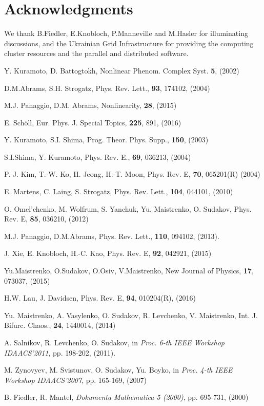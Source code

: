 \documentclass[epjST]{svjour}
\begin{document}
\section*{Acknowledgments} 
\hspace*{0.5cm}
\noindent We thank  B.Fiedler,  E.Knobloch, P.Manneville  and M.Hasler for
illuminating discussions, and 
the Ukrainian Grid Infrastructure for providing the computing
cluster resources and the parallel and distributed software.


\begin{thebibliography}{100}

Y. Kuramoto, D. Battogtokh, Nonlinear Phenom. Complex Syst. {\bf 5}, (2002) 

D.M.Abrams, S.H. Strogatz,  Phys. Rev. Lett., {\bf 93}, 174102, (2004)

M.J. Panaggio, D.M. Abrams,  Nonlinearity, {\bf 28}, (2015)

E. Sch\"{o}ll, Eur. Phys. J. Special Topics, {\bf 225}, 891, (2016)

Y. Kuramoto, S.I. Shima,  Prog. Theor. Phys. Supp., {\bf 150}, (2003)

S.I.Shima, Y. Kuramoto,   Phys. Rev. E., {\bf  69},
036213, (2004)

P.-J. Kim, T.-W. Ko, H. Jeong, H.-T. Moon, Phys. Rev. E,
{\bf 70}, 065201(R) (2004)

E. Martens, C. Laing, S. Strogatz,  Phys. Rev. Lett., {\bf 104},
044101, (2010) 

O. Omel'chenko, M. Wolfrum, S. Yanchuk, Yu. Maistrenko, O. Sudakov,  Phys. Rev. E, {\bf 85}, 036210, (2012)

 M.J. Panaggio, D.M.Abrams,  Phys. Rev. Lett., {\bf 110}, 094102, (2013).

J. Xie, E. Knobloch,  H.-C. Kao, Phys. Rev. E, {\bf92}, 042921, (2015)

Yu.Maistrenko, O.Sudakov, O.Osiv, V.Maistrenko, 
New Journal of Physics, {\bf 17}, 073037, (2015)

H.W. Lau, J. Davidsen,  Phys. Rev. E, {\bf94}, 010204(R), (2016)

Yu. Maistrenko, A. Vasylenko, O. Sudakov, R. Levchenko, V. Maistrenko,  
Int. J. Bifurc. Chaos., {\bf 24}, 1440014, (2014)


A. Salnikov, R. Levchenko, O. Sudakov, in 
{\it Proc. 6-th IEEE Workshop IDAACS'2011},  pp. 198-202, (2011).

M. Zynovyev, M. Svistunov, O. Sudakov, Yu. Boyko, in {\it Proc. 4-th IEEE Workshop IDAACS'2007}, 
pp. 165-169, (2007) 



B. Fiedler, R. Mantel,  
 {\it  Dokumenta Mathematica 5 (2000)}, pp. 695-731, (2000)


\end{thebibliography}
\end{document}
